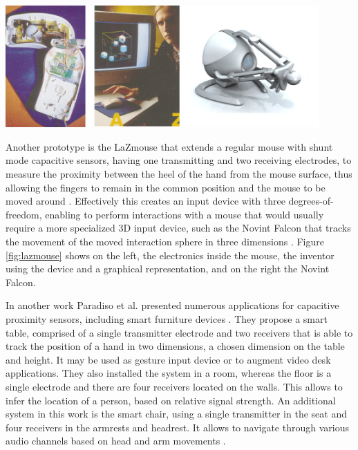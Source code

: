 \begin{minipage}{\linewidth}
\centering
\includegraphics[width=0.9\textwidth]{images/lazmouse}
\label{fig:lazmouse}
\end{minipage}

Another prototype is the LaZmouse that extends a regular mouse with shunt mode capacitive sensors, having one transmitting and two receiving electrodes, to measure the proximity between the heel of the hand from the mouse surface, thus allowing the fingers to remain in the common position and the mouse to be moved around \cite{smith1999thesis}. Effectively this creates an input device with three degrees-of-freedom, enabling to perform interactions with a mouse that would usually require a more specialized 3D input device, such as the Novint Falcon that tracks the movement of the moved interaction sphere in three dimensions \cite{novint2014}. Figure \ref{fig:lazmouse} shows on the left, the electronics inside the mouse, the inventor using the device and a graphical representation, and on the right the Novint Falcon.

In another work Paradiso et al. presented numerous applications for capacitive proximity sensors, including smart furniture devices \cite{ Zimmerman1995}. They propose a smart table, comprised of a single transmitter electrode and two receivers that is able to track the position of a hand in two dimensions, a chosen dimension on the table and height. It may be used as gesture input device or to augment video desk applications. They also installed the system in a room, whereas the floor is a single electrode and there are four receivers located on the walls. This allows to infer the location of a person, based on relative signal strength. An additional system in this work is the smart chair, using a single transmitter in the seat and four receivers in the armrests and headrest. It allows to navigate through various audio channels based on head and arm movements \cite{ schmandt1995audiostreamer}.

